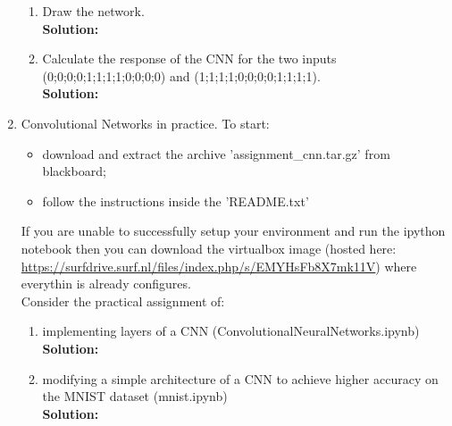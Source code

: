 \documentclass[a4paper]{article}
\begin{document}
\begin{enumerate}
\begin{enumerate}
	\item Draw the network.\\
	\textbf{Solution:}\\
	
	
	
	
	
	
	
	
	\item Calculate the response of the CNN for the two inputs (0;0;0;0;1;1;1;1;0;0;0;0) and (1;1;1;1;0;0;0;0;1;1;1;1).\\
	\textbf{Solution:}\\
	
\end{enumerate}	

\item Convolutional Networks in practice. To start:

\begin{itemize}
	\item download and extract the archive 'assignment\_cnn.tar.gz' from blackboard;
	\item follow the instructions inside the 'README.txt'
\end{itemize}

If you are unable to successfully setup your environment and run the ipython notebook then you can download the virtualbox image (hosted here: \url{https://surfdrive.surf.nl/files/index.php/s/EMYHsFb8X7mk11V}) where everythin is already configures.\\
Consider the practical assignment of:

\begin{enumerate}
	\item implementing layers of a CNN (ConvolutionalNeuralNetworks.ipynb)\\
	\textbf{Solution:}\\
	
	
	
	\item modifying a simple architecture of a CNN to achieve higher accuracy on the MNIST dataset (mnist.ipynb)\\
	\textbf{Solution:}\\
	
\end{enumerate}
	
\end{enumerate}
\end{document}
